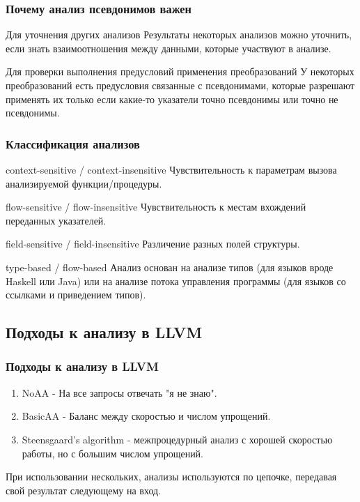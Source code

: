 \documentclass[utf8,russian]{beamer}
\begin{document}
\begin{frame}
\frametitle{Почему анализ псевдонимов важен}

\begin{block}{Для уточнения других анализов}
Результаты некоторых анализов можно уточнить, если знать взаимоотношения между данными, которые участвуют в анализе.
\end{block}

\begin{block}{Для проверки выполнения предусловий применения преобразований}
У некоторых преобразований есть предусловия связанные с псевдонимами, которые разрешают применять их только если какие-то указатели точно псевдонимы или точно не псевдонимы.
\end{block}

\end{frame}

\begin{frame}
\frametitle{Классификация анализов}

\begin{block}{context-sensitive / context-insensitive}
Чувствительность к параметрам вызова анализируемой функции/процедуры.
\end{block}

\begin{block}{flow-sensitive / flow-insensitive}
Чувствительность к местам вхождений переданных указателей.
\end{block}

\begin{block}{field-sensitive / field-insensitive}
Различение разных полей структуры.
\end{block}

\begin{block}{type-based / flow-based}
Анализ основан на анализе типов (для языков вроде Haskell или Java) или на анализе потока управления программы (для языков со ссылками и приведением типов).
\end{block}


\end{frame}

\subsection{Подходы к анализу в LLVM}

\begin{frame}
\frametitle{Подходы к анализу в LLVM}

\begin{enumerate}
\item NoAA - На все запросы отвечать "я не знаю".
\item BasicAA - Баланс между скоростью и числом упрощений.
\item Steensgaard’s algorithm - межпроцедурный анализ с хорошей скоростью работы, но с большим числом упрощений.
\end{enumerate}

При использовании нескольких, анализы используются по цепочке, передавая свой результат следующему на вход.
\end{frame}
\end{document}
